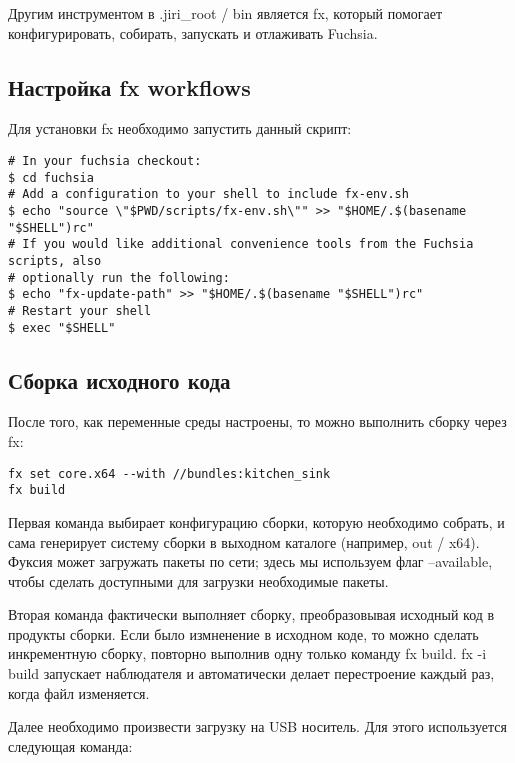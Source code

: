 \documentclass[14pt,a4paper]{article}
\begin{document}
\par Другим инструментом в .jiri\_root / bin является fx, который помогает конфигурировать, собирать, запускать и отлаживать Fuchsia.\\

\subsection{Настройка fx workflows}

Для установки fx необходимо запустить данный скрипт:

\begin{lstlisting}[language=c caption={}]
# In your fuchsia checkout:
$ cd fuchsia
# Add a configuration to your shell to include fx-env.sh
$ echo "source \"$PWD/scripts/fx-env.sh\"" >> "$HOME/.$(basename "$SHELL")rc"
# If you would like additional convenience tools from the Fuchsia scripts, also
# optionally run the following:
$ echo "fx-update-path" >> "$HOME/.$(basename "$SHELL")rc"
# Restart your shell
$ exec "$SHELL"
\end{lstlisting}


\subsection{Сборка исходного кода}

После того, как переменные среды настроены, то можно выполнить сборку через fx:

\begin{lstlisting}[language=c caption={}]
fx set core.x64 --with //bundles:kitchen_sink
fx build
\end{lstlisting}

\par Первая команда выбирает конфигурацию сборки, которую необходимо собрать, и сама генерирует систему сборки в выходном каталоге (например, out / x64). Фуксия может загружать пакеты по сети; здесь мы используем флаг --available, чтобы сделать доступными для загрузки необходимые пакеты. \\

\par Вторая команда фактически выполняет сборку, преобразовывая исходный код в продукты сборки. Если было измненение в исходном коде, то можно сделать инкрементную сборку, повторно выполнив одну только команду fx build. fx -i build запускает наблюдателя и автоматически делает перестроение каждый раз, когда файл изменяется.

\par Далее необходимо произвести загрузку на USB носитель. Для этого используется следующая команда:
\end{document}
